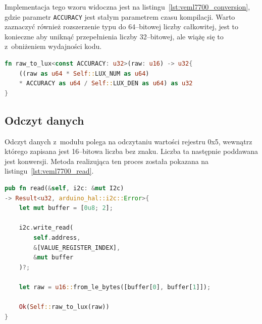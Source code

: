 Implementacja tego wzoru widoczna jest na listingu~\ref{lst:veml7700_conversion}, gdzie
parametr \texttt{ACCURACY} jest stałym parametrem czasu kompilacji. Warto zaznaczyć
również rozszerzenie typu do 64--bitowej liczby całkowitej, jest to konieczne
aby uniknąć przepełnienia liczby 32--bitowej, ale wiążę się to z~obniżeniem
wydajności kodu.

\begin{lstlisting}[language=Rust, style=colouredRust, 
    caption={Konwersja surowych danych modułu VEML7700 na wartość wyrażoną w~luksach},
    label={lst:veml7700_conversion}
]
fn raw_to_lux<const ACCURACY: u32>(raw: u16) -> u32{
    ((raw as u64 * Self::LUX_NUM as u64) 
    * ACCURACY as u64 / Self::LUX_DEN as u64) as u32
}
\end{lstlisting}

\subsection*{Odczyt danych}
Odczyt danych z~modułu polega na odczytaniu wartości rejestru 0x5,
wewnątrz którego zapisana jest 16--bitowa liczba bez znaku.
Liczba ta następnie poddawana jest konwersji.
Metoda realizująca ten proces została pokazana na 
listingu~\ref{lst:veml7700_read}.

\begin{lstlisting}[language=Rust, style=colouredRust, 
    caption={Odczyt danych z~modułu VEML7700},
    label={lst:veml7700_read}
]
pub fn read(&self, i2c: &mut I2c) 
-> Result<u32, arduino_hal::i2c::Error>{
    let mut buffer = [0u8; 2];

    i2c.write_read(
        self.address, 
        &[VALUE_REGISTER_INDEX], 
        &mut buffer
    )?;

    let raw = u16::from_le_bytes([buffer[0], buffer[1]]);

    Ok(Self::raw_to_lux(raw))
}
\end{lstlisting}